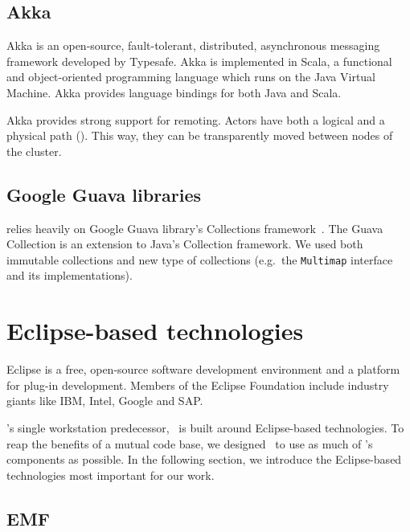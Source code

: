 \subsection{Akka}


Akka is an open-source, fault-tolerant, distributed, asynchronous messaging framework developed by Typesafe. %
Akka is implemented in Scala, a functional and object-oriented programming language which runs on the Java Virtual Machine. Akka provides language bindings for both Java and Scala.


Akka provides strong support for remoting. Actors have both a logical and a physical path (). This way, they can be transparently moved between nodes of the cluster.


\subsection{Google Guava libraries}

\iqd{} relies heavily on Google Guava library's Collections framework~\cite{guava}. The Guava Collection is an extension to Java's Collection framework. We used both immutable collections and new type of collections (e.g.\ the \texttt{Multimap} interface and its implementations).

\section{Eclipse-based technologies}

Eclipse is a free, open-source software development environment and a platform for plug-in development. Members of the Eclipse Foundation include industry giants like IBM, Intel, Google and SAP.

\iqd's single workstation predecessor, \eiq\ is built around Eclipse-based technologies. To reap the benefits of a mutual code base, we designed \iqd\ to use as much of \eiq's components as possible. In the following section, we introduce the Eclipse-based technologies most important for our work.

\subsection{EMF}
\label{subsec:EMF}


